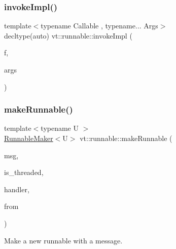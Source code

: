 \subsubsection{\texorpdfstring{invoke\+Impl()}{invokeImpl()}\hspace{0.1cm}{\footnotesize\ttfamily [2/2]}}
{\footnotesize\ttfamily template$<$typename Callable , typename... Args$>$ \\
decltype(auto) vt\+::runnable\+::invoke\+Impl (\begin{DoxyParamCaption}\item[{Callable \&\&}]{f,  }\item[{Args \&\&...}]{args }\end{DoxyParamCaption})}

\mbox{\label{namespacevt_1_1runnable_afb8d5dae85a94591271296e201b4f838}} 
\subsubsection{\texorpdfstring{make\+Runnable()}{makeRunnable()}}
{\footnotesize\ttfamily template$<$typename U $>$ \\
\hyperlink{structvt_1_1runnable_1_1_runnable_maker}{Runnable\+Maker}$<$U$>$ vt\+::runnable\+::make\+Runnable (\begin{DoxyParamCaption}\item[{\hyperlink{namespacevt_ab2b3d506ec8e8d1540aede826d84a239}{Msg\+Shared\+Ptr}$<$ U $>$ const \&}]{msg,  }\item[{bool}]{is\+\_\+threaded,  }\item[{\hyperlink{namespacevt_af64846b57dfcaf104da3ef6967917573}{Handler\+Type}}]{handler,  }\item[{\hyperlink{namespacevt_a866da9d0efc19c0a1ce79e9e492f47e2}{Node\+Type}}]{from }\end{DoxyParamCaption})}



Make a new runnable with a message. 


